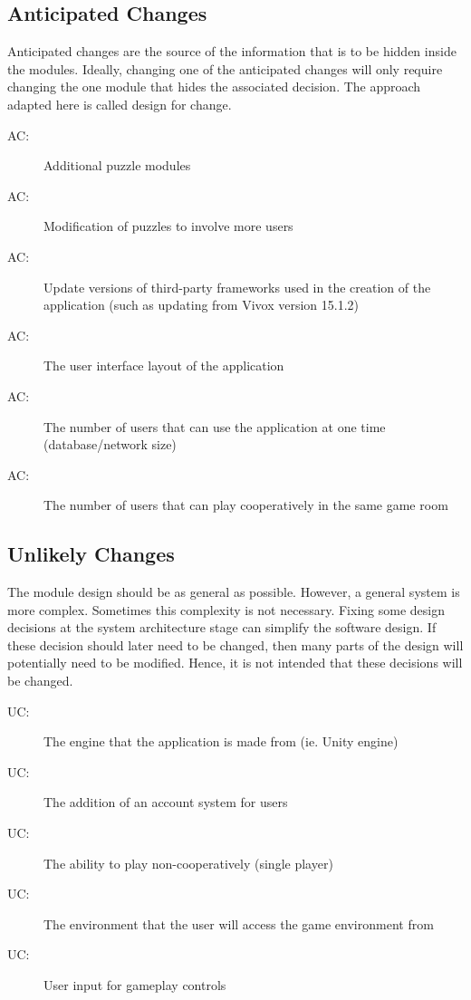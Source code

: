 \documentclass[12pt, titlepage]{article}
\newcounter{acnum}
\newcommand{\actheacnum}{AC\theacnum}
\newcounter{ucnum}
\newcommand{\uctheucnum}{UC\theucnum}
\begin{document}
\subsection{Anticipated Changes} \label{SecAchange}

Anticipated changes are the source of the information that is to be hidden
inside the modules. Ideally, changing one of the anticipated changes will only
require changing the one module that hides the associated decision. The approach
adapted here is called design for
change.

\begin{description}
\item[ \actheacnum \label{acInput2}:] Additional puzzle modules
\item[ \actheacnum \label{acInput3}:] Modification of puzzles to involve more users
\item[ \actheacnum \label{acInput4}:] Update versions of third-party frameworks used in the creation of the application (such as updating from Vivox version 15.1.2)
\item[ \actheacnum \label{acInput5}:] The user interface layout of the application
\item[ \actheacnum \label{acInput6}:] The number of users that can use the application at one time (database/network size)
\item[ \actheacnum \label{acInput7}:] The number of users that can play cooperatively in the same game room
\end{description}

\subsection{Unlikely Changes} \label{SecUchange}

The module design should be as general as possible. However, a general system is
more complex. Sometimes this complexity is not necessary. Fixing some design
decisions at the system architecture stage can simplify the software design. If
these decision should later need to be changed, then many parts of the design
will potentially need to be modified. Hence, it is not intended that these
decisions will be changed.

\begin{description}
\item[ \uctheucnum \label{UC1}:] The engine that the application is made from (ie. Unity engine)
\item[ \uctheucnum \label{UC2}:] The addition of an account system for users
\item[ \uctheucnum \label{UC3}:] The ability to play non-cooperatively (single player)
\item[ \uctheucnum \label{UC4}:] The environment that the user will access the game environment from
\item[ \uctheucnum \label{UC5}:] User input for gameplay controls
\end{description}
\end{document}
